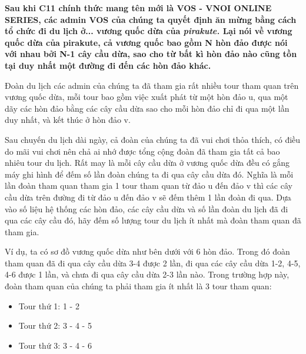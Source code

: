 \textbf{Sau khi C11 chính thức mang tên mới là VOS - VNOI ONLINE SERIES, các admin VOS của chúng ta quyết định ăn mừng bằng cách tổ chức đi du lịch ở... vương quốc dừa của \emph{ pirakute. } Lại nói về vương quốc dừa của pirakute, cả vương quốc bao gồm \textbf{ N }\textbf{}\textbf{ hòn đảo được nói với nhau bởi }\textbf{\textbf{ N-1 }}\textbf{ cây cầu dừa, sao cho từ bất kì hòn đảo nào cũng tồn tại duy nhất một đường đi đến các hòn đảo khác. }}

Đoàn du lịch các admin của chúng ta đã tham gia rất nhiều tour tham quan trên vương quốc dừa, mỗi tour bao gồm việc xuất phát từ một hòn đảo u, qua một dãy các hòn đảo bằng các cây cầu dừa sao cho mỗi hòn đảo chỉ đi qua một lần duy nhất, và kết thúc ở hòn đảo v.

Sau chuyến du lịch dài ngày, cả đoàn của chúng ta đã vui chơi thỏa thích, có điều do mãi vui chơi nên chả ai nhớ được tổng cộng đoàn đã tham gia tất cả bao nhiêu tour du lịch. Rất may là mỗi cây cầu dừa ở vương quốc dừa đều có gắng máy ghi hình để đếm số lần đoàn chúng ta đi qua cây cầu dừa đó. Nghĩa là mỗi lần đoàn tham quan tham gia 1 tour tham quan từ đảo u đến đảo v thì các cây cầu dừa trên đường đi từ đảo u đến đảo v sẽ đếm thêm 1 lần đoàn đi qua. Dựa vào số liệu hệ thống các hòn đảo, các cây cầu dừa và số lần đoàn du lịch đã đi qua các cây cầu đó, hãy đếm số lượng tour du lịch ít nhất mà đoàn tham quan đã tham gia.

Ví dụ, ta có sơ đồ vương quốc dừa như bên dưới với 6 hòn đảo. Trong đó đoàn tham quan đã đi qua cây cầu dừa 3-4 được 2 lần, đi qua các cây cầu dừa 1-2, 4-5, 4-6 được 1 lần, và chưa đi qua cây cầu dừa 2-3 lần nào. Trong trường hợp này, đoàn tham quan của chúng ta phải tham gia ít nhất là 3 tour tham quan:
\begin{itemize}
	\item Tour thứ 1: 1 - 2
	\item Tour thứ 2: 3 - 4 - 5
	\item Tour thứ 3: 3 - 4 - 6
\end{itemize}